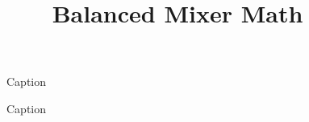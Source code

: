 \documentclass[11pt]{article}
\title{Balanced Mixer Math}
\date{}
\begin{document}
\maketitle

\begin{abstract}

\end{abstract}





\begin{figure}
    \centering
    
    \caption{Caption}
    \label{fig:my_label}
\end{figure}
%
\begin{figure}
    \centering
    
    \caption{Caption}
    \label{fig:my_label}
\end{figure}
\end{document}
